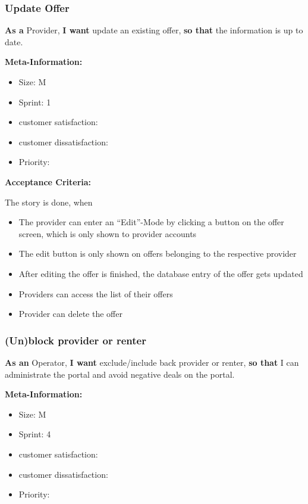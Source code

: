 \subsubsection{Update Offer}

\textbf{As a} Provider,\hfill\break
\textbf{I want} update an existing offer,\hfill\break
\textbf{so that} the information is up to date.

\textbf{Meta-Information:}
\begin{itemize}
    \item Size: M
    \item Sprint: 1
    \item customer satisfaction:
    \item customer dissatisfaction:
    \item Priority:
\end{itemize}

\textbf{Acceptance Criteria:}

The story is done, when
\begin{itemize}
    \item The provider can enter an “Edit”-Mode by clicking a button on the offer screen, which is only shown to provider accounts
    \item The edit button is only shown on offers belonging to the respective provider
    \item After editing the offer is finished, the database entry of the offer gets updated
    \item Providers can access the list of their offers
    \item Provider can delete the offer
\end{itemize}

\subsubsection{(Un)block provider or renter}

\textbf{As an} Operator,\hfill\break
\textbf{I want} exclude/include back provider or renter,\hfill\break
\textbf{so that} I can administrate the portal and avoid negative deals on the portal.

\textbf{Meta-Information:}
\begin{itemize}
    \item Size: M
    \item Sprint: 4
    \item customer satisfaction:
    \item customer dissatisfaction:
    \item Priority:
\end{itemize}


